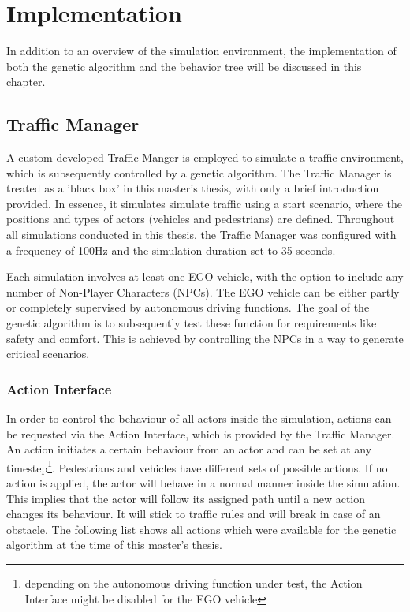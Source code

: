 \chapter{Implementation}
\label{chap:implementation}

In addition to an overview of the simulation environment, the implementation of both the genetic algorithm and the behavior tree will be discussed in this chapter.

\section{Traffic Manager}
A custom-developed Traffic Manger is employed to simulate a traffic environment, which is subsequently controlled by a genetic algorithm. The Traffic Manager is treated as a 'black box' in this master's thesis, with only a brief introduction provided. In essence, it simulates simulate traffic using a start scenario, where the positions and types of actors (vehicles and pedestrians) are defined. Throughout all simulations conducted in this thesis, the Traffic Manager was configured with a frequency of 100Hz and the simulation duration set to 35 seconds.

Each simulation involves at least one EGO vehicle, with the option to include any number of Non-Player Characters (NPCs). The EGO vehicle can be either partly or completely supervised by autonomous driving functions. The goal of the genetic algorithm is to subsequently test these function for requirements like safety and comfort. This is achieved by controlling the NPCs in a way to generate critical scenarios.

\subsection{Action Interface}
\label{sect:implementation:action_interface}
In order to control the behaviour of all actors inside the simulation, actions can be requested via the Action Interface, which is provided by the Traffic Manager. An action initiates a certain behaviour from an actor and can be set at any timestep\footnote{depending on the autonomous driving function under test, the Action Interface might be disabled for the EGO vehicle}. Pedestrians and vehicles have different sets of possible actions. If no action is applied, the actor will behave in a normal manner inside the simulation. This implies that the actor will follow its assigned path until a new action changes its behaviour. It will stick to traffic rules and will break in case of an obstacle. The following list shows all actions which were available for the genetic algorithm at the time of this master's thesis.

